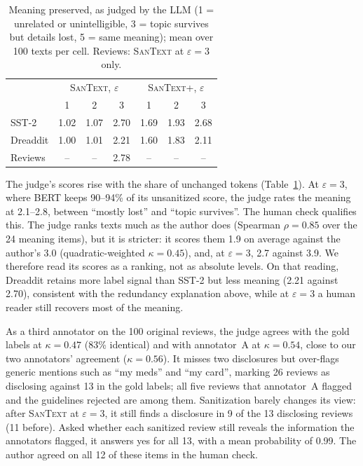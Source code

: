\documentclass[11pt]{article}
\newcommand{\santext}{\textsc{SanText}}
\newcommand{\santextp}{\textsc{SanText}+}
\begin{document}
\begin{table}[t]
\centering\small
\setlength{\tabcolsep}{4pt}
\begin{tabular}{@{}lcccccc@{}}
\toprule
 & \multicolumn{3}{c}{\santext{}, $\varepsilon$} & \multicolumn{3}{c}{\santextp{}, $\varepsilon$} \\
 & 1 & 2 & 3 & 1 & 2 & 3 \\
\midrule
SST-2 & 1.02 & 1.07 & 2.70 & 1.69 & 1.93 & 2.68 \\
Dreaddit & 1.00 & 1.01 & 2.21 & 1.60 & 1.83 & 2.11 \\
Reviews & -- & -- & 2.78 & -- & -- & -- \\
\bottomrule
\end{tabular}
\caption{Meaning preserved, as judged by the LLM (1 = unrelated or unintelligible, 3 = topic survives but details lost, 5 = same meaning); mean over 100 texts per cell. Reviews: \santext{} at $\varepsilon = 3$ only.}
\label{tab:judge}
\end{table}
The judge's scores rise with the share of unchanged tokens (Table~\ref{tab:judge}). At $\varepsilon = 3$, where BERT keeps 90--94\% of its unsanitized score, the judge rates the meaning at 2.1--2.8, between ``mostly lost'' and ``topic survives''. The human check qualifies this. The judge ranks texts much as the author does (Spearman $\rho = 0.85$ over the 24 meaning items), but it is stricter: it scores them 1.9 on average against the author's 3.0 (quadratic-weighted $\kappa = 0.45$), and, at $\varepsilon = 3$, 2.7 against 3.9. We therefore read its scores as a ranking, not as absolute levels. On that reading, Dreaddit retains more label signal than SST-2 but less meaning (2.21 against 2.70), consistent with the redundancy explanation above, while at $\varepsilon = 3$ a human reader still recovers most of the meaning.

As a third annotator on the 100 original reviews, the judge agrees with the gold labels at $\kappa = 0.47$ (83\% identical) and with annotator~A at $\kappa = 0.54$, close to our two annotators' agreement ($\kappa = 0.56$). It misses two disclosures but over-flags generic mentions such as ``my meds'' and ``my card'', marking 26 reviews as disclosing against 13 in the gold labels; all five reviews that annotator~A flagged and the guidelines rejected are among them. Sanitization barely changes its view: after \santext{} at $\varepsilon = 3$, it still finds a disclosure in 9 of the 13 disclosing reviews (11 before). Asked whether each sanitized review still reveals the information the annotators flagged, it answers yes for all 13, with a mean probability of 0.99. The author agreed on all 12 of these items in the human check.
\end{document}
